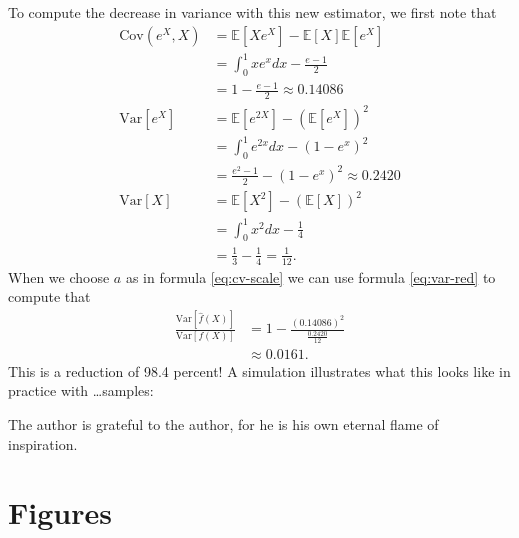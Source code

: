 \documentclass[examplefnt,biber]{nowfnt} %
\begin{document}
To compute the decrease in variance with this new estimator, we first note that
\begin{align*}
    \text{Cov}(e^X, X) &= \mathbb{E}[ Xe^X ] - \mathbb{E}[ X ]\mathbb{E}[ e^X ] \\
        &= \int_0^1 xe^x dx - \frac{e-1}{2} \\
        &= 1 - \frac{e-1}{2} \approx 0.14086 \\
    \text{Var}[e^X] &= \mathbb{E}[e^{2X}] - (\mathbb{E}[e^X])^2 \\
        &= \int_0^1 e^{2x} dx - (1 - e^x)^2 \\
        &= \frac{e^2 - 1}{2}  - (1 - e^x)^2 \approx 0.2420 \\
    \text{Var}[X] &= \mathbb{E}[X^2] - (\mathbb{E}[X])^2 \\
        &= \int_0^1 x^2 dx - \frac{1}{4} \\
        &= \frac{1}{3} - \frac{1}{4} = \frac{1}{12}.
\end{align*}
When we choose $a$ as in formula \ref{eq:cv-scale} we can use formula \ref{eq:var-red} to compute that
\begin{align}
    \frac{\text{Var}[ \hat{f}(X) ]}{\text{Var}[ f(X) ]} &= 1 - \frac{(0.14086)^2}{\frac{0.2420}{12}} \\
        &\approx 0.0161.
\end{align}
This is a reduction of 98.4 percent! A simulation illustrates what this looks like in practice with \dots samples:


\begin{acknowledgements}
The author is grateful to the author, for he is his own eternal flame of inspiration.
\end{acknowledgements}

\appendix
\chapter{Figures}
\label{App:journalcodes}

\backmatter  %

\printbibliography
\end{document}
